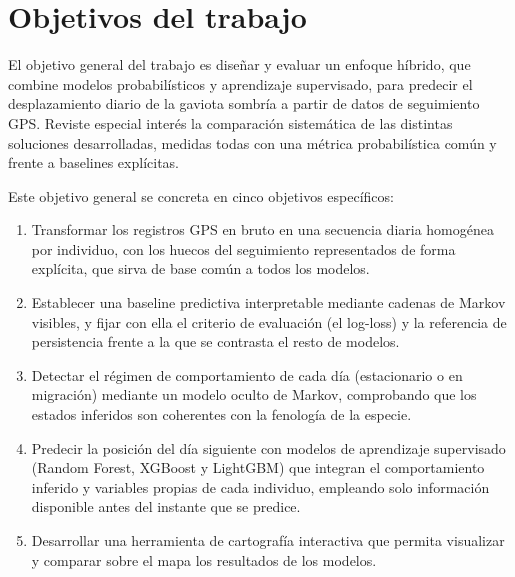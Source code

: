 \section{Objetivos del trabajo}
\label{sec:intro-objetivos}

El objetivo general del trabajo es diseñar y evaluar un enfoque híbrido, que
combine modelos probabilísticos y aprendizaje supervisado, para predecir el
desplazamiento diario de la gaviota sombría a partir de datos de seguimiento GPS.
Reviste especial interés la comparación sistemática de las distintas soluciones
desarrolladas, medidas todas con una métrica probabilística común y frente a
baselines explícitas.

Este objetivo general se concreta en cinco objetivos específicos:

\begin{enumerate}
  \item Transformar los registros GPS en bruto en una secuencia diaria homogénea
  por individuo, con los huecos del seguimiento representados de forma explícita,
  que sirva de base común a todos los modelos.
  \item Establecer una baseline predictiva interpretable mediante cadenas de
  Markov visibles, y fijar con ella el criterio de evaluación (el log-loss) y la
  referencia de persistencia frente a la que se contrasta el resto de modelos.
  \item Detectar el régimen de comportamiento de cada día (estacionario o en
  migración) mediante un modelo oculto de Markov, comprobando que los estados
  inferidos son coherentes con la fenología de la especie.
  \item Predecir la posición del día siguiente con modelos de aprendizaje
  supervisado (Random Forest, XGBoost y LightGBM) que integran el comportamiento
  inferido y variables propias de cada individuo, empleando solo información
  disponible antes del instante que se predice.
  \item Desarrollar una herramienta de cartografía interactiva que permita
  visualizar y comparar sobre el mapa los resultados de los modelos.
\end{enumerate}
